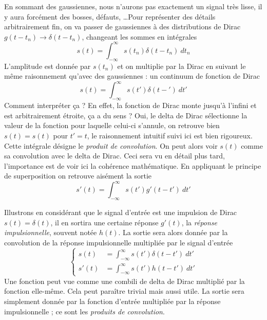 En sommant des gaussiennes, nous n'aurons pas exactement un signal très lisse, il y aura forcément 
des bosses, défauts, \dots Pour représenter des détails arbitrairement fin, on va passer de 
gaussiennes à des distributions de Dirac $g(t-t_n) \rightarrow \delta(t-t_n)$, changeant les 
sommes en intégrales
\begin{equation}
s(t) = \int_{-\infty}^\infty s(t_n)\delta(t-t_n)\ dt_n
\end{equation}
L'amplitude est donnée par $s(t_n)$ et on multiplie par la Dirac en suivant le même raisonnement 
qu'avec des gaussiennes : un continuum de fonction de Dirac
\begin{equation}
s(t) = \int_{-\infty}^\infty s(t')\delta(t-')\ dt'
\end{equation}
Comment interpréter ça ? En effet, la fonction de Dirac monte jusqu'à l'infini et est arbitrairement 
étroite, ça a du sens ? Oui, le delta de Dirac sélectionne la valeur de la fonction pour laquelle 
celui-ci s'annule, on retrouve bien $s(t)=s(t)$ pour $t'=t$, le raisonnement intuitif suivi ici est bien 
rigoureux. Cette intégrale désigne le \textit{produit de convolution}. On peut alors voir $s(t)$ 
comme sa convolution avec le delta de Dirac. Ceci sera vu en détail plus tard, l'importance est 
de voir ici la cohérence mathématique. En appliquant le principe de superposition on retrouve 
aisément la sortie
\begin{equation}
s'(t) = \int_{-\infty}^\infty s(t')g'(t-t')\ dt'
\end{equation}

Illustrons en considérant que le signal d'entrée est une impulsion de Dirac $s(t) = \delta(t)$, 
il en sortira une certaine réponse $g'(t)$, la \textit{réponse impulsionnelle}, souvent notée $h(t)$. 
La sortie sera alors donnée par la convolution de la réponse impulsionnelle multipliée par le signal 
d'entrée
\begin{equation}
\left\{\begin{array}{ll}
s(t) &= \int_{-\infty}^\infty s(t')\delta(t-t')\ dt'\\
s'(t) &= \int_{-\infty}^\infty s(t')h(t-t')\ dt'
\end{array}\right.
\end{equation}
Une fonction peut vue comme une combili de delta de Dirac multiplié par la fonction elle-même. Cela 
peut paraître trivial mais aussi utile. La sortie sera simplement donnée par la fonction d'entrée 
multipliée par la réponse impulsionnelle ; ce sont les \textit{produits de convolution}.\\

